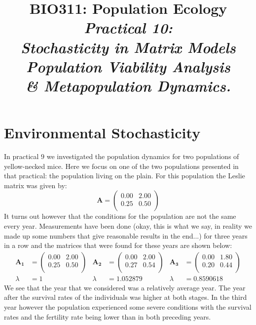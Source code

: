 \documentclass{article}\usepackage[]{graphicx}\usepackage[]{color}
\title{BIO311: Population Ecology\\ \textit{Practical 10:\\ Stochasticity in Matrix Models\\ Population Viability Analysis\\ \& Metapopulation Dynamics.}}
\begin{document}


\maketitle
\tableofcontents
\vspace{3cm}

\newpage


\section{Environmental Stochasticity}
In practical $9$ we investigated the population dynamics for two populations of yellow-necked mice. Here we focus on one of the two populations presented in that practical: the population living on the plain. For this population the Leslie matrix was given by:
\begin{equation*} \boldsymbol{A}=%
\begin{pmatrix}{}
  0.00 & 2.00 \\ 
  0.25 & 0.50 \\ 
  \end{pmatrix}
\end{equation*}
It turns out however that the conditions for the population are not the same every year. Measurements have been done (okay, this is what we say, in reality we made up some numbers that give reasonable results in the end...) for three years in a row and the matrices that were found for these years are shown below:
\begin{align*}\boldsymbol{A_1} &=%
\begin{pmatrix}{}
  0.00 & 2.00 \\ 
  0.25 & 0.50 \\ 
  \end{pmatrix}
& \boldsymbol{A_2} &=%
\begin{pmatrix}{}
  0.00 & 2.00 \\ 
  0.27 & 0.54 \\ 
  \end{pmatrix}
& \boldsymbol{A_3} &=%
\begin{pmatrix}{}
  0.00 & 1.80 \\ 
  0.20 & 0.44 \\ 
  \end{pmatrix}
\\ \lambda &= 1 &\lambda &= 1.052879 &\lambda &= 0.8590618\end{align*}
We see that the year that we considered was a relatively average year. The year after the survival rates of the individuals was higher at both stages. In the third year however the population experienced some severe conditions with the survival rates and the fertility rate being lower than in both preceding years.
\end{document}
